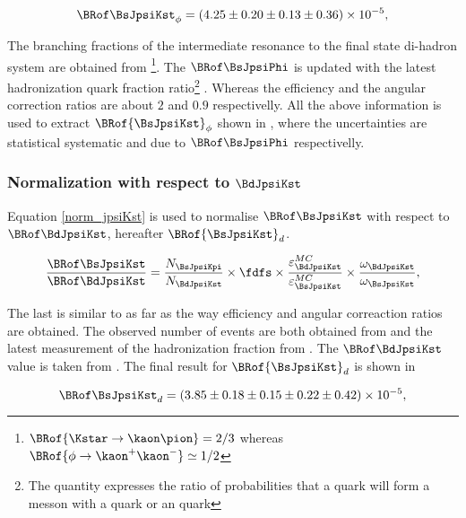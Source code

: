 \begin{equation}
\BRof\BsJpsiKst_{\phi} = (4.25 \pm 0.20 \pm 0.13 \pm 0.36) \times 10^{-5},
\label{Br_JpsiPhi}
\end{equation}

\noindent The branching fractions of the intermediate resonance to the final state di-hadron system are obtained from \cite{PDG}
\footnote{ $\BRof{\Kstar\to\kaon\pion} = 2/3$ whereas $\BRof{\phi\to\kaon^+\kaon^-}\simeq 1/2$}.
The $\BRof\BsJpsiPhi$ \cite{SheldonKK} is updated with the latest hadronization \bquark quark fraction
ratio\footnote{The quantity \fdfs expresses the ratio of probabilities that a \bquark quark will form a messon with a \dquark quark or an \squark quark}
\cite{LHCb-CONF-2013-011}. Whereas the efficiency and the angular correction ratios are about $2$ and $0.9$ respectivelly.
All the above information is used to extract $\BRof{\BsJpsiKst}_\phi$ shown in , where the uncertainties
are statistical systematic and due to  $\BRof\BsJpsiPhi$ respectivelly.


\subsubsection{Normalization with respect to $\BdJpsiKst$}
Equation \ref{norm_jpsiKst} is used to normalise $\BRof\BsJpsiKst$ with respect to $\BRof\BdJpsiKst$, hereafter $\BRof{\BsJpsiKst}_d$.

\begin{equation}
\frac{\BRof\BsJpsiKst}{\BRof\BdJpsiKst} = \frac{N_{\BsJpsiKpi}}{N_{\BdJpsiKst}} \times \fdfs \times \frac{\varepsilon_{\BdJpsiKst}^{MC}}{\varepsilon_{\BsJpsiKst}^{MC}}
                                                                          \times \frac{\omega_{\BdJpsiKst}}{\omega_{\BsJpsiKst}},
\label{norm_jpsiKst}
\end{equation}

\noindent The last is similar to  as far as the way efficiency and angular correaction ratios are obtained.
The observed number of events are both obtained from  and the latest measurement of the hadronization
fraction from \cite{LHCb-CONF-2013-011}. The $\BRof\BdJpsiKst$ value is taken from \cite{Abe:2002haa}. The final result for $\BRof{\BsJpsiKst}_d$
is shown in 

\begin{equation}
\BRof\BsJpsiKst_{d} = (3.85 \pm 0.18 \pm 0.15 \pm 0.22 \pm 0.42 )\times 10^{-5},
\label{Br_JpsiKst}
\end{equation}

